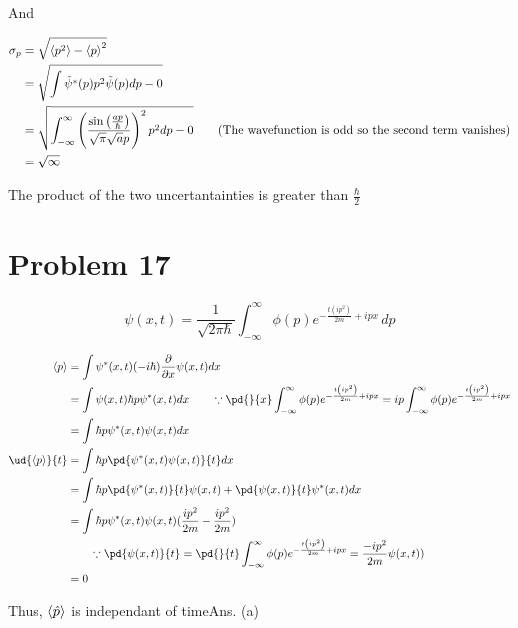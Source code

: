 \documentclass[12pt]{article}
\begin{document}
And

\begin{align*}\sigma_p&=\sqrt{\Braket{p^2}-\Braket{p}^2}\\
&=\sqrt{\int \tilde{\psi}^*(p)p^2\tilde{\psi}(p)dp-0}\\
&= \sqrt{\int_{-\infty}^\infty \left(\frac{\sin \left(\frac{a p}{\hbar }\right)}{\sqrt{\pi } \sqrt{a} p}\right)^2 p^2 dp - 0}\qquad\text{(The wavefunction is odd so the second term vanishes)}\\
&=\sqrt{\infty}
\end{align*}

The product of the two uncertantainties is greater than $\frac\hbar2$
\section*{Problem 17}

$$\psi(x,t)=\frac{1}{\sqrt{2 \pi  \hbar }}\int_{-\infty }^{\infty }  \phi(p)  e^{-\frac{t \left(i p^2\right)}{2 m}+i p x} \, dp$$

\begin{align*}
\Braket{p} &=\int \psi^*(x,t)(-i\hbar)\frac{\partial}{\partial x}\psi(x,t) dx\\
&=\int \psi(x,t)\hbar p\psi^*(x,t) dx \qquad\because \pd{}{x}\int_{-\infty }^{\infty }  \phi(p)  e^{-\frac{t \left(i p^2\right)}{2 m}+i p x} = ip \int_{-\infty }^{\infty }  \phi(p)  e^{-\frac{t \left(i p^2\right)}{2 m}+i p x}\\
&=\int \hbar p \psi^*(x,t)\psi(x,t)dx\\
\ud{\Braket{p}}{t} &= \int \hbar p \pd{\psi^*(x,t)\psi(x,t)}{t}dx\\
&= \int\hbar p \pd{\psi^*(x,t)}{t}\psi(x,t)+ \pd{\psi(x,t)}{t}\psi^*(x,t) dx\\
&=\int \hbar p \psi^*(x,t)\psi(x,t)(\frac{ip^2}{2m}-\frac{ip^2}{2m})\\ &\qquad \because \pd{\psi(x,t)}{t}=\pd{}{t}\int_{-\infty }^{\infty }  \phi(p)  e^{-\frac{t \left(i p^2\right)}{2 m}+i p x}= \frac{-ip^2}{2m}\psi(x,t))\\
&=0
\end{align*}

Thus, $\Braket{\hat p}$ is independant of time\hfill Ans. (a)
\end{document}
